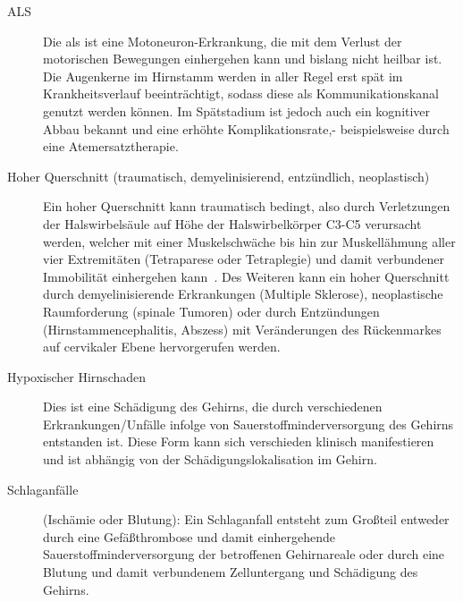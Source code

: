 
\begin{description}
\item[ALS] Die \acs{als} ist eine Motoneuron-Erkrankung, die mit dem Verlust der motorischen Bewegungen einhergehen kann und bislang nicht heilbar ist. Die Augenkerne im Hirnstamm werden in aller Regel erst spät im Krankheitsverlauf beeinträchtigt, sodass diese als Kommunikationskanal genutzt werden können. Im Spätstadium ist jedoch auch ein kognitiver Abbau bekannt und eine erhöhte Komplikationsrate,- beispielsweise durch eine Atemersatztherapie.
\item[Hoher Querschnitt (traumatisch, demyelinisierend, entzündlich, neoplastisch)] Ein hoher Quer\-schnitt kann traumatisch bedingt, also durch Verletzungen der Halswirbelsäule auf Höhe der Halswirbelkörper C3-C5 verursacht werden, welcher mit einer Muskelschwäche bis hin zur Muskellähmung aller vier Extremitäten (Tetraparese oder Tetraplegie) und damit verbundener Immobilität einhergehen kann~\cite{VanMiddendorp2014a}. Des Weiteren kann ein hoher Querschnitt durch demyelinisierende Erkrankungen (\zB Multiple Sklerose), neoplastische Raumforderung (spinale Tumoren) oder durch Entzündungen (Hirnstammencephalitis, Abszess) mit Veränderungen des Rückenmarkes auf cervikaler Ebene hervorgerufen werden.
\item[Hypoxischer Hirnschaden] Dies ist eine Schädigung des Gehirns, die durch verschiedenen Erkrankungen/Unfälle infolge von Sauerstoffminderversorgung des Gehirns entstanden ist. Diese Form kann sich verschieden klinisch manifestieren und ist abhängig von der Schädigungslokalisation im Gehirn. 
\item[Schlaganfälle] (Ischämie oder Blutung): Ein Schlaganfall entsteht zum Großteil entweder durch eine Gefäßthrombose und damit einhergehende Sauerstoffminderversorgung der betroffenen Gehirnareale oder durch eine Blutung und damit verbundenem Zelluntergang und Schädigung des Gehirns. 

\end{description}
